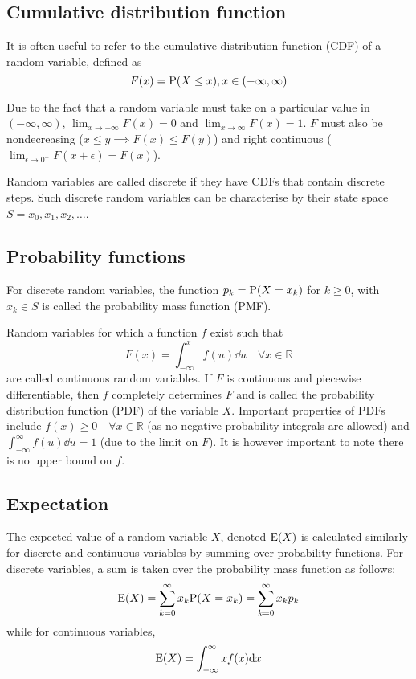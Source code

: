 \subsection{Cumulative distribution function}
It is often useful to refer to the cumulative distribution function (CDF) of a random variable, defined as 
\begin{equation}
  \label{eq:cdf}
  F(x) = \mathrm{P}(X \leq x), x \in (-\infty,\infty)
\end{equation}

Due to the fact that a random variable must take on a particular value in $(-\infty,\infty)$, $\lim_{x \to -\infty} F(x) = 0$ and $\lim_{x \to \infty} F(x) = 1$.
$F$ must also be nondecreasing ($x \leq y \implies F(x) \leq F(y)$) and right continuous ($\lim_{\epsilon \to 0^+} F(x+\epsilon) = F(x)$).

Random variables are called discrete if they have CDFs that contain discrete steps.  
Such discrete random variables can be characterise by their state space $S = {x_0, x_1, x_2, \dots}$.

\subsection{Probability functions}
For discrete random variables, the function $p_k = \mathrm{P}(X=x_k)$ for $k \geq 0$, with $x_k \in S$ is called the probability mass function (PMF).

Random variables for which a function $f$ exist such that 
\begin{equation}
  \label{eq:cdffrompdf}
  F(x) = \int_{-\infty}^xf(u)\dd u \quad \forall x \in \mathbb{R}
\end{equation}
are called continuous random variables.
If $F$ is continuous and piecewise differentiable, then $f$ completely determines $F$ and is called the probability distribution function (PDF) of the variable $X$.
Important properties of PDFs include $f(x) \geq 0 \quad \forall x \in \mathbb{R}$ (as no negative probability integrals are allowed) and $\int_{-\infty}^{\infty} f(u) \dd u = 1$ (due to the limit on $F$).  
It is however important to note there is no upper bound on $f$.

\subsection{Expectation}
The expected value of a random variable $X$, denoted $\mathrm{E}(X)$ is calculated similarly for discrete and continuous variables by summing over probability functions.  
For discrete variables, a sum is taken over the probability mass function as follows:
\begin{equation}
  \label{eq:discreteexpectation}
  \mathrm{E}(X) = \sum_{k=0}^{\infty} x_k\mathrm{P}(X = x_k) = \sum_{k=0}^{\infty} x_kp_k
\end{equation}
while for continuous variables,
\begin{equation}
  \label{eq:continuousexpectation}
  \mathrm{E}(X) = \int_{-\infty}^{\infty}xf(x) \mathrm{d} x
\end{equation}

